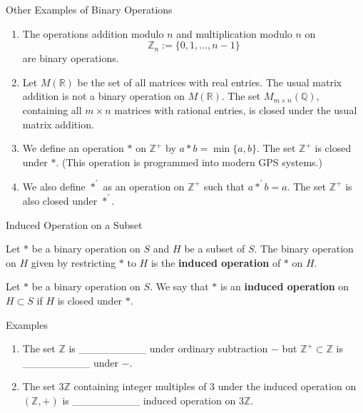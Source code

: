 \documentclass{beamer}
\begin{document}
\begin{frame}{Other Examples of Binary Operations}
\begin{enumerate}
\justifying
\item The operations addition modulo $n$ and multiplication modulo $n$ on 
\[
\mathbb{Z}_n := \{0, 1, \dots, n - 1\}
\]
are binary operations.
\pause
\item Let $M(\mathbb{R})$ be the set of all matrices with real entries. The usual matrix addition is not a binary operation on $M(\mathbb{R})$. The set $M_{m \times n}(\mathbb{Q})$, containing all $m \times n$ matrices with rational entries, is closed under the usual matrix addition.
\pause
\item We define an operation $*$ on $\mathbb{Z}^+$ by $a*b = \min\{a, b\}$. The set $\mathbb{Z}^+$ is closed under $*$. (This operation is programmed into modern GPS systems.)
\pause
\item We also define $*^{\prime}$ as an operation on $\mathbb{Z}^+$ such that $a *^{\prime} b = a$. The set $\mathbb{Z}^+$ is also closed under $*^{\prime}$.
\end{enumerate}    
\end{frame}

\begin{frame}{Induced Operation on a Subset}
\begin{definition}
\justifying
Let $*$ be a binary operation on $S$ and $H$ be a subset of $S$. The binary operation on $H$ given by restricting $*$ to $H$ is the \textbf{induced operation} of $*$ on $H$.
\end{definition}    
\pause
\begin{definition}[Restated]
\justifying
Let $*$ be a binary operation on $S$. We say that $*$ is an \textbf{induced operation} on $H \subset S$ if $H$ is closed under $*$.
\end{definition}
\end{frame}

\begin{frame}{Examples}
\begin{enumerate}
\justifying
\item The set $\mathbb{Z}$ is \_\_\_\_\_\_\_\_\_ under ordinary subtraction $-$ but $\mathbb{Z}^+ \subset \mathbb{Z}$ is \_\_\_\_\_\_\_\_\_ under $-$.
\pause
\item The set $3\mathbb{Z}$ containing integer multiples of $3$ under the induced operation on $(\mathbb{Z}, +)$ is \_\_\_\_\_\_\_\_\_ induced operation on $3\mathbb{Z}$.
\end{enumerate}
\end{frame}
\end{document}
